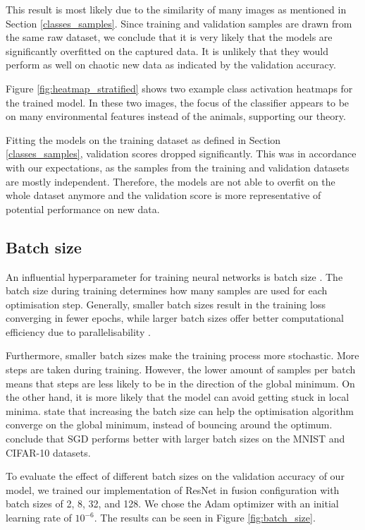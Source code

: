 \documentclass{l4proj}
\begin{document}
This result is most likely due to the similarity of many images as mentioned in Section \ref{classes_samples}. Since training and validation samples are drawn from the same raw dataset, we conclude that it is very likely that the models are significantly overfitted on the captured data. It is unlikely that they would perform as well on chaotic new data as indicated by the validation accuracy. 

Figure \ref{fig:heatmap_stratified} shows two example class activation heatmaps for the trained model. In these two images, the focus of the classifier appears to be on many environmental features instead of the animals, supporting our theory.

Fitting the models on the training dataset as defined in Section \ref{classes_samples}, validation scores dropped significantly. This was in accordance with our expectations, as the samples from the training and validation datasets are mostly independent. Therefore, the models are not able to overfit on the whole dataset anymore and the validation score is more representative of potential performance on new data.

\subsection{Batch size}

An influential hyperparameter for training neural networks is batch size \citep{ioffe_batch_2015}. The batch size during training determines how many samples are used for each optimisation step. Generally, smaller batch sizes result in the training loss converging in fewer epochs, while larger batch sizes offer better computational efficiency due to parallelisability \cite{devarakonda_adabatch_2018}.

Furthermore, smaller batch sizes make the training process more stochastic. More steps are taken during training. However, the lower amount of samples per batch means that steps are less likely to be in the direction of the global minimum. On the other hand, it is more likely that the model can avoid getting stuck in local minima. \citet{smith_dont_2018} state that increasing the batch size can help the optimisation algorithm converge on the global minimum, instead of bouncing around the optimum. \citet{radiuk_impact_2017} conclude that SGD performs better with larger batch sizes on the MNIST and CIFAR-10 datasets.

To evaluate the effect of different batch sizes on the validation accuracy of our model, we trained our implementation of ResNet in fusion configuration with batch sizes of 2, 8, 32, and 128. We chose the Adam optimizer with an initial learning rate of $10^{-6}$. The results can be seen in Figure \ref{fig:batch_size}.
\end{document}
